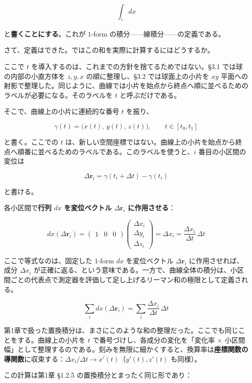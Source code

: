 \documentclass[a4paper,12pt,openany]{book}
\begin{document}
\[\int_\gamma dx\]

と\textbf{書くことにする}。これが \(1\)-form
の積分——線積分——の定義である。

さて、定義はできた。ではこの和を実際に計算するにはどうするか。

ここで \(t\) を導入するのは、これまでの方針を捨てるためではない。§3.1
では球の内部の小直方体を \(z,y,x\) の順に整理し、§3.2 では球面上の小片を
\(xy\)
平面への射影で整理した。同じように、曲線では小片を始点から終点へ順に並べるためのラベルが必要になる。そのラベルを
\(t\) と呼ぶだけである。

そこで、曲線上の小片に連続的な番号 \(t\) を振り、

\[\gamma(t) = \bigl(x(t),\, y(t),\, z(t)\bigr),\qquad t \in [t_0, t_1]\]

と書く。ここでの \(t\)
は、新しい空間座標ではない。曲線上の小片を始点から終点へ順番に並べるためのラベルである。このラベルを使うと、\(i\)
番目の小区間の変位は

\[
\Delta\mathbf{r}_i = \gamma(t_i+\Delta t)-\gamma(t_i)
\]

と書ける。

各小区間で\textbf{行列 $dx$ を変位ベクトル $\Delta\mathbf{r}_i$ に作用させる}：

\[dx(\Delta\mathbf{r}_i) = \begin{pmatrix}1&0&0\end{pmatrix} \begin{pmatrix}\Delta x_i \\ \Delta y_i \\ \Delta z_i\end{pmatrix} = \Delta x_i = \frac{\Delta x_i}{\Delta t}\,\Delta t\]

ここで等式なのは、固定した \(1\)-form \(dx\) を変位ベクトル
\(\Delta\mathbf{r}_i\) に作用させれば、成分 \(\Delta x_i\)
が正確に返る、という意味である。一方で、曲線全体の積分は、小区間ごとの代表点で測定器を評価して足し上げるリーマン和の極限として定義される。

\[\sum_i dx(\Delta\mathbf{r}_i) = \sum_i \frac{\Delta x_i}{\Delta t}\,\Delta t\]

第1章で扱った置換積分は、まさにこのような和の整理だった。ここでも同じことをする。曲線上の小片を
\(t\) で番号づけし、各成分の変化を「変化率 \(\times\)
小区間幅」として整理するのである。刻みを無限に細かくすると、換算率は\textbf{座標関数の導関数}に収束する：\(\Delta x_i/\Delta t \to x'(t)\)（\(y'(t), z'(t)\)
も同様）。

この計算は第1章 §1.2.5 の置換積分とまったく同じ形であり：
\end{document}
